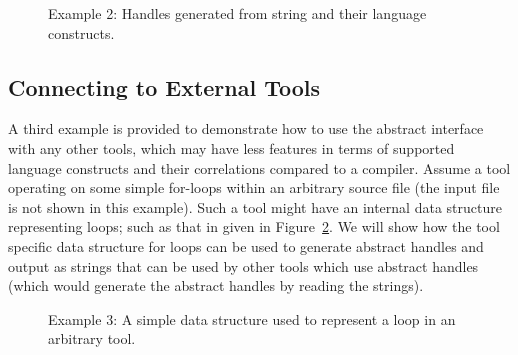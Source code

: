 \begin{figure}[!h]
{\indent
{\mySmallFontSize
\begin{latexonly}
  
\end{latexonly}

\begin{htmlonly}
   
\end{htmlonly}

}
}
\caption{Example 2: Handles generated from string and their language constructs.}
\label{Tutorial:abstractHandle2out}
\end{figure}

\clearpage
\subsection{Connecting to External Tools}
   A third example is provided to demonstrate how to use the abstract interface
with any other tools, which may have less features in terms of supported language
constructs and their correlations compared to a compiler. 
Assume a tool operating on some simple for-loops within an arbitrary source file (the
input file is not shown in this example). Such a tool might
have an internal data structure representing loops; such as that in given in 
Figure~\ref{Tutorial:myloop}.  We will show how the tool specific data structure
for loops can be used to generate abstract handles and output as strings that can
be used by other tools which use abstract handles (which would generate the
abstract handles by reading the strings).
\begin{figure}[!h]
{\indent
{\mySmallFontSize
\begin{latexonly}
  
\end{latexonly}

\begin{htmlonly}
   
\end{htmlonly}

}
}
\caption{Example 3: A simple data structure used to represent a loop in an arbitrary tool.}
\label{Tutorial:myloop}
\end{figure}

